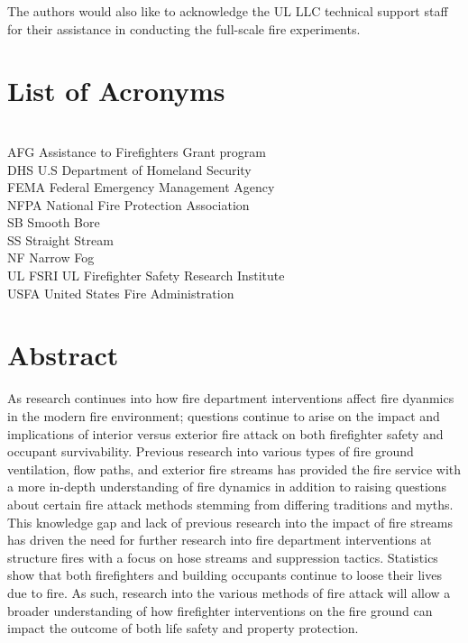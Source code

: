 \documentclass[12pt,oneside]{book}
\begin{document}
The authors would also like to acknowledge the UL LLC technical support staff for their assistance in conducting the full-scale fire experiments.

\cleardoublepage
{}
{}
\tableofcontents

\cleardoublepage
{}
{}
\listoffigures

\cleardoublepage
{}
{}
\listoftables

\chapter{List of Acronyms}

\begin{tabbing}
\hspace{1.5in} \= \\
AFG \> Assistance to Firefighters Grant program  \\
DHS \> U.S Department of Homeland Security   \\   
FEMA \> Federal Emergency Management Agency  \\
NFPA \> National Fire Protection Association \\
SB \> Smooth Bore \\
SS \> Straight Stream \\
NF \> Narrow Fog \\
UL FSRI \> UL Firefighter Safety Research Institute \\
USFA \> United States Fire Administration  \\
\end{tabbing}

\newpage

\mainmatter

\chapter*{Abstract}

As research continues into how fire department interventions affect fire dyanmics in the modern fire environment; questions continue to arise on the impact and implications of interior versus exterior fire attack on both firefighter safety and occupant survivability. Previous research into various types of fire ground ventilation, flow paths, and exterior fire streams has provided the fire service with a more in-depth understanding of fire dynamics in addition to raising questions about certain fire attack methods stemming from differing traditions and myths. This knowledge gap and lack of previous research into the impact of fire streams has driven the need for further research into fire department interventions at structure fires with a focus on hose streams and suppression tactics. Statistics show that both firefighters and building occupants continue to loose their lives due to fire. As such, research into the various methods of fire attack will allow a broader understanding of how firefighter interventions on the fire ground can impact the outcome of both life safety and property protection. 
\end{document}

